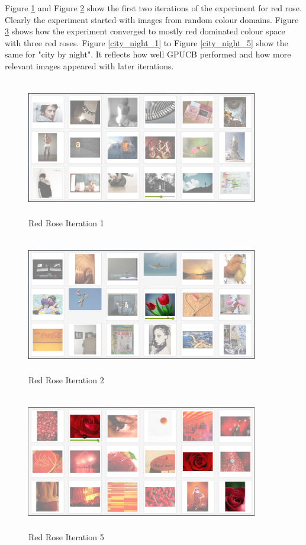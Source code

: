 \documentclass[english]{tktltiki}
\begin{document}
Figure \ref{red_rose_1} and Figure \ref{red_rose_2} show the first two iterations of the experiment for red rose. Clearly the experiment started with images from random colour domains. Figure \ref{red_rose_5} shows how the experiment converged to mostly red dominated colour space with three red roses. Figure \ref{city_night_1} to Figure \ref{city_night_5} show the same for "city by night". It reflects how well GPUCB performed and how more relevant images appeared with later iterations.
\begin{figure}[!h]
  \centering
    \includegraphics[width=0.90\textwidth,height=6cm]{figures/Rose_1.png}
    \caption{Red Rose Iteration 1}
    \label{red_rose_1}
\end{figure}

\begin{figure}[h!]
  \centering
    \includegraphics[width=0.90\textwidth,height=6cm]{figures/Rose_2.png}
    \caption{Red Rose Iteration 2}
    \label{red_rose_2}
\end{figure}

\begin{figure}[h!]
  \centering
    \includegraphics[width=0.90\textwidth,height=6cm]{figures/Rose_5.png}
    \caption{Red Rose Iteration 5}
    \label{red_rose_5}
\end{figure}
\end{document}
